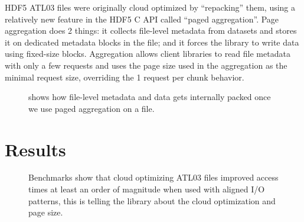 \documentclass[
]{agujournal2019}
\begin{document}
HDF5 ATL03 files were originally cloud optimized by ``repacking'' them,
using a relatively new feature in the HDF5 C API called ``paged
aggregation''. Page aggregation does 2 things: it collects file-level
metadata from datasets and stores it on dedicated metadata blocks in the
file; and it forces the library to write data using fixed-size blocks.
Aggregation allows client libraries to read file metadata with only a
few requests and uses the page size used in the aggregation as the
minimal request size, overriding the 1 request per chunk behavior.

\begin{figure}


\caption{\label{fig-2}shows how file-level metadata and data gets
internally packed once we use paged aggregation on a file.}

\end{figure}%

\section{Results}\label{results}

\begin{figure}


\caption{\label{fig-3}Benchmarks show that cloud optimizing ATL03 files
improved access times at least an order of magnitude when used with
aligned I/O patterns, this is telling the library about the cloud
optimization and page size.}

\end{figure}%
\end{document}
